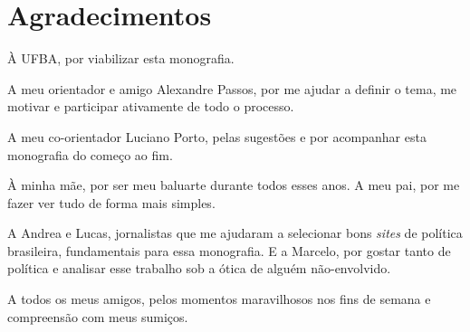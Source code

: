 \chapter*{Agradecimentos}

À UFBA, por viabilizar esta monografia.

A meu orientador e amigo Alexandre Passos, por me ajudar a definir o tema, me motivar e participar ativamente de todo o processo.

A meu co-orientador Luciano Porto, pelas sugestões e por acompanhar esta monografia do começo ao fim.

À minha mãe, por ser meu baluarte durante todos esses anos. A meu pai, por me fazer ver tudo de forma mais simples.

A Andrea e Lucas, jornalistas que me ajudaram a selecionar bons \emph{sites} de política brasileira, fundamentais para essa monografia. E a Marcelo, por gostar tanto de política e analisar esse trabalho sob a ótica de alguém não-envolvido.

A todos os meus amigos, pelos momentos maravilhosos nos fins de semana e compreensão com meus sumiços.


